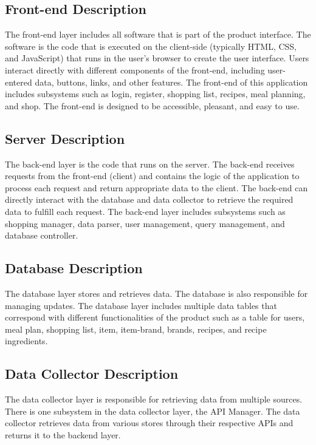 \subsection{Front-end Description}
The front-end layer includes all software that is part of the product interface. The software is the code that is executed on the client-side (typically HTML, CSS, and JavaScript) that runs in the user's browser to create the user interface. Users interact directly with different components of the front-end, including user-entered data, buttons, links, and other features. The front-end of this application includes subsystems such as login, register, shopping list, recipes, meal planning, and shop. The front-end is designed to be accessible, pleasant, and easy to use.

\subsection{Server Description}
The back-end layer is the code that runs on the server. The back-end receives requests from the front-end (client) and contains the logic of the application to process each request and return appropriate data to the client. The back-end can directly interact with the database and data collector to retrieve the required data to fulfill each request. The back-end layer includes subsystems such as shopping manager, data parser, user management, query management, and database controller.

\subsection{Database Description}
The database layer stores and retrieves data. The database is also responsible for managing updates. The database layer includes multiple data tables that correspond with different functionalities of the product such as a table for users, meal plan, shopping list, item, item-brand, brands, recipes, and recipe ingredients.

\subsection{Data Collector Description}
The data collector layer is responsible for retrieving data from multiple sources. There is one subsystem in the data collector layer, the API Manager. The data collector retrieves data from various stores through their respective APIs and returns it to the backend layer.

